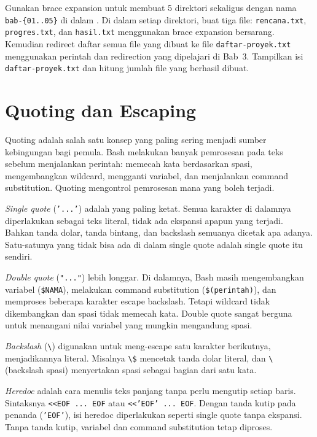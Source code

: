 \begin{challengebox}
Gunakan brace expansion untuk membuat 5 direktori sekaligus dengan nama
\texttt{bab-\{01..05\}} di dalam .
Di dalam setiap direktori, buat tiga file: \texttt{rencana.txt},
\texttt{progres.txt}, dan \texttt{hasil.txt} menggunakan brace expansion
bersarang. Kemudian redirect daftar semua file yang dibuat ke file
\texttt{daftar-proyek.txt} menggunakan perintah  dan
redirection yang dipelajari di Bab~3. Tampilkan isi
\texttt{daftar-proyek.txt} dan hitung jumlah file yang berhasil dibuat.
\end{challengebox}

\section{Quoting dan Escaping}
\label{sec:quoting-escaping}

Quoting adalah salah satu konsep yang paling sering menjadi sumber
kebingungan bagi pemula. Bash melakukan banyak pemrosesan pada teks sebelum
menjalankan perintah: memecah kata berdasarkan spasi, mengembangkan
wildcard, mengganti variabel, dan menjalankan command substitution. Quoting
mengontrol pemrosesan mana yang boleh terjadi.

\textit{Single quote} (\texttt{'...'}) adalah yang paling ketat. Semua
karakter di dalamnya diperlakukan sebagai teks literal, tidak ada ekspansi
apapun yang terjadi. Bahkan tanda dolar, tanda bintang, dan backslash
semuanya dicetak apa adanya. Satu-satunya yang tidak bisa ada di dalam
single quote adalah single quote itu sendiri.

\textit{Double quote} (\texttt{"..."}) lebih longgar. Di dalamnya, Bash
masih mengembangkan variabel (\texttt{\$NAMA}), melakukan command
substitution (\texttt{\$(perintah)}), dan memproses beberapa karakter
escape backslash. Tetapi wildcard tidak dikembangkan dan spasi tidak
memecah kata. Double quote sangat berguna untuk menangani nilai variabel
yang mungkin mengandung spasi.

\textit{Backslash} (\texttt{\textbackslash}) digunakan untuk meng-escape
satu karakter berikutnya, menjadikannya literal. Misalnya
\texttt{\textbackslash\$} mencetak tanda dolar literal, dan
\texttt{\textbackslash\ } (backslash spasi) menyertakan spasi sebagai
bagian dari satu kata.

\textit{Heredoc} adalah cara menulis teks panjang tanpa perlu mengutip
setiap baris. Sintaksnya \texttt{<<EOF ... EOF} atau
\texttt{<<'EOF' ... EOF}. Dengan tanda kutip pada penanda (\texttt{'EOF'}),
isi heredoc diperlakukan seperti single quote tanpa ekspansi. Tanpa tanda
kutip, variabel dan command substitution tetap diproses.

